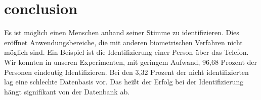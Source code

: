 \section{conclusion}
Es ist möglich einen Menschen anhand seiner Stimme zu identifizieren. Dies eröffnet Anwendungsbereiche, die mit anderen biometrischen Verfahren nicht möglich sind. Ein Beispiel ist die Identifizierung einer Person über das Telefon. Wir konnten in unseren Experimenten, mit geringem Aufwand, 96,68 Prozent der Personen eindeutig Identifizieren. Bei den 3,32 Prozent der nicht identifizierten lag eine schlechte Datenbasis vor. Das heißt der Erfolg bei der Identifizierung hängt signifikant von der Datenbank ab.